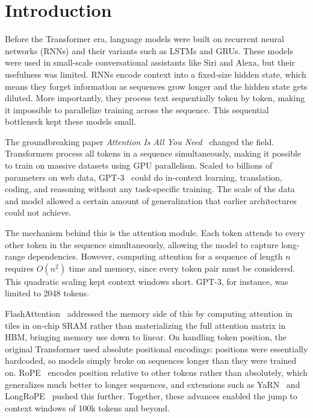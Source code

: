 \setcounter{tocdepth}{2}
\tableofcontents
\newpage

\section{Introduction}

Before the Transformer era, language models were built on recurrent neural networks (RNNs) and their variants such as LSTMs and GRUs.
These models were used in small-scale conversational assistants like Siri and Alexa, but their usefulness was limited.
RNNs encode context into a fixed-size hidden state, which means they forget information as sequences grow longer and the hidden state gets diluted.
More importantly, they process text sequentially token by token, making it impossible to parallelize training across the sequence.
This sequential bottleneck kept these models small.

The groundbreaking paper \textit{Attention Is All You Need}~\citep{vaswani2017attention} changed the field.
Transformers process all tokens in a sequence simultaneously, making it possible to train on massive datasets using GPU parallelism.
Scaled to billions of parameters on web data, GPT-3~\citep{brown2020gpt3} could do in-context learning, translation, coding, and reasoning without any task-specific training.
The scale of the data and model allowed a certain amount of generalization that earlier architectures could not achieve.

The mechanism behind this is the attention module.
Each token attends to every other token in the sequence simultaneously, allowing the model to capture long-range dependencies. However, computing attention for a sequence of length $n$ requires $O(n^2)$ time and memory, since every token pair must be considered. This quadratic scaling kept context windows short.
GPT-3, for instance, was limited to 2048 tokens.

FlashAttention~\citep{dao2022flashattention} addressed the memory side of this by computing attention in tiles in on-chip SRAM rather than materializing the full attention matrix in HBM, bringing memory use down to linear.
On handling token position, the original Transformer used absolute positional encodings: positions were essentially hardcoded, so models simply broke on sequences longer than they were trained on. RoPE~\citep{su2024rope} encodes position relative to other tokens rather than absolutely, which generalizes much better to longer sequences, and extensions such as YaRN~\citep{peng2023yarn} and LongRoPE~\citep{ding2024longrope} pushed this further. Together, these advances enabled the jump to context windows of 100k tokens and beyond.

